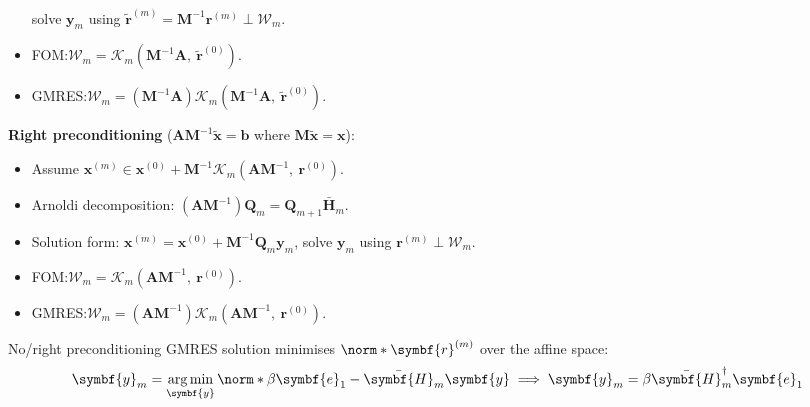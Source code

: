 \documentclass{article}
\DeclareMathOperator{\argmin}{arg\, min}
\begin{document}
\begin{minipage}[t]{126.1962963mm}
\begin{itemize}
              solve \(\symbf{y}_m\) using \(\tilde{\symbf{r}}^{\left( m
              \right)} = \symbf{M}^{-1} \symbf{r}^{\left( m \right)}
              \perp \symbf{\mathcal{W}}_m\).
        \item FOM:\@ \(\symbf{\mathcal{W}}_m =
              \symbf{\mathcal{K}}_m\left( \symbf{M}^{-1} \symbf{A},\:
              \tilde{\symbf{r}}^{\left( 0 \right)} \right)\).
        \item GMRES:\@ \(\symbf{\mathcal{W}}_m = \left( \symbf{M}^{-1}
              \symbf{A} \right) \symbf{\mathcal{K}}_m\left(
              \symbf{M}^{-1} \symbf{A},\: \tilde{\symbf{r}}^{\left( 0
              \right)} \right)\).
    \end{itemize}
    \textbf{Right preconditioning} (\(\symbf{A} \symbf{M}^{-1} \tilde{\symbf{x}} = \symbf{b}\) where \(\symbf{M} \tilde{\symbf{x}} = \symbf{x}\)):
    \begin{itemize}
        \item Assume \(\symbf{x}^{\left( m \right)} \in
              \symbf{x}^{\left( 0 \right)} + \symbf{M}^{-1}
              \mathcal{K}_m\left( \symbf{A} \symbf{M}^{-1},\:
              \symbf{r}^{\left( 0 \right)} \right)\).
        \item Arnoldi decomposition: \(\left( \symbf{A} \symbf{M}^{-1}
              \right) \symbf{Q}_m = \symbf{Q}_{m+1}
              \bar{\symbf{H}}_m\).
        \item Solution form: \(\symbf{x}^{\left( m \right)} =
              \symbf{x}^{\left( 0 \right)} + \symbf{M}^{-1} \symbf{Q}_m
              \symbf{y}_m\), solve \(\symbf{y}_m\) using
              \(\symbf{r}^{\left( m \right)} \perp
              \symbf{\mathcal{W}}_m\).
        \item FOM:\@ \(\symbf{\mathcal{W}}_m =
              \symbf{\mathcal{K}}_m\left( \symbf{A} \symbf{M}^{-1},\:
              \symbf{r}^{\left( 0 \right)} \right)\).
        \item GMRES:\@ \(\symbf{\mathcal{W}}_m = \left( \symbf{A}
              \symbf{M}^{-1} \right) \symbf{\mathcal{K}}_m\left(
              \symbf{A} \symbf{M}^{-1},\: \symbf{r}^{\left( 0 \right)}
              \right)\).
    \end{itemize}
    No/right preconditioning GMRES solution minimises \(\norm*{\symbf{r}^{\left( m \right)}}\)
    over the affine space:
    \begin{equation*}
        \symbf{y}_m = \argmin_{\symbf{y}} \norm*{\beta \symbf{e}_1 - \bar{\symbf{H}}_m \symbf{y}} \implies \symbf{y}_m = \beta \bar{\symbf{H}}_m^\dagger \symbf{e}_1
    \end{equation*}
\end{minipage}
\end{document}
